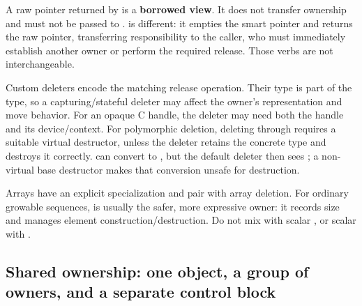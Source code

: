 A raw pointer returned by  is a \textbf{borrowed view}. It does not transfer ownership and must not be passed to .  is different: it empties the smart pointer and returns the raw pointer, transferring responsibility to the caller, who must immediately establish another owner or perform the required release. Those verbs are not interchangeable.

Custom deleters encode the matching release operation. Their type is part of the  type, so a capturing/stateful deleter may affect the owner's representation and move behavior. For an opaque C handle, the deleter may need both the handle and its device/context. For polymorphic deletion, deleting  through  requires a suitable virtual destructor, unless the deleter retains the concrete type and destroys it correctly.  can convert to , but the default deleter then sees ; a non-virtual base destructor makes that conversion unsafe for destruction.

Arrays have an explicit  specialization and pair with array deletion. For ordinary growable sequences,  is usually the safer, more expressive owner: it records size and manages element construction/destruction. Do not mix  with scalar , or scalar  with .

\subsection{Shared ownership: one object, a group of owners, and a separate control block}\label{01-foundations-i-ch004-shared-ownership-one-object-a-group-of-owners-and-a-separate-control-block}

